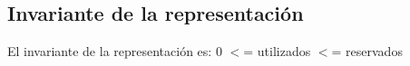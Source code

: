 \hypertarget{repConjunto_invConjunto}{}\subsection{Invariante de la representación}\label{repConjunto_invConjunto}
El invariante de la representación es\+: 0 $<$= utilizados $<$= reservados 